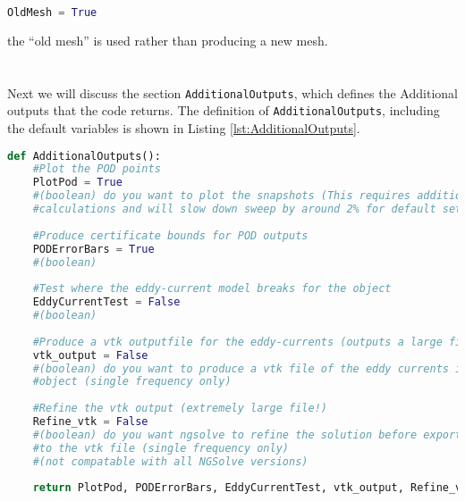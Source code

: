 \begin{lstlisting}[language=Python]
OldMesh = True
\end{lstlisting}
the ``old mesh'' is used rather than producing a new mesh.\\
\\
\\
\noindent
Next we will discuss the section \texttt{AdditionalOutputs}, which defines the Additional outputs that the code returns. The definition of \texttt{AdditionalOutputs}, including the default variables is shown in Listing \ref{lst:AdditionalOutputs}. 

\begin{lstlisting}[language=Python, caption={AdditionalOutputs definition}, label={lst:AdditionalOutputs}]
def AdditionalOutputs():
    #Plot the POD points
    PlotPod = True
    #(boolean) do you want to plot the snapshots (This requires additional
    #calculations and will slow down sweep by around 2% for default settings)
    
    #Produce certificate bounds for POD outputs
    PODErrorBars = True
    #(boolean)
    
    #Test where the eddy-current model breaks for the object
    EddyCurrentTest = False
    #(boolean)
    
    #Produce a vtk outputfile for the eddy-currents (outputs a large file!)
    vtk_output = False
    #(boolean) do you want to produce a vtk file of the eddy currents in the
    #object (single frequency only)
    
    #Refine the vtk output (extremely large file!)
    Refine_vtk = False
    #(boolean) do you want ngsolve to refine the solution before exporting
    #to the vtk file (single frequency only)
    #(not compatable with all NGSolve versions)
    
    return PlotPod, PODErrorBars, EddyCurrentTest, vtk_output, Refine_vtk
\end{lstlisting}

